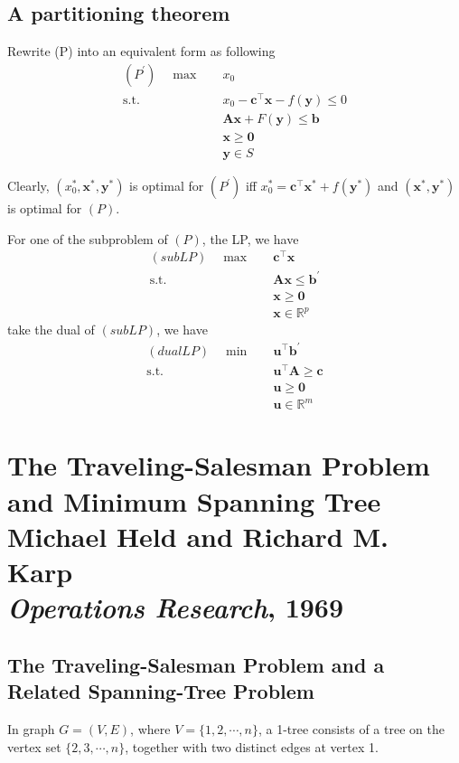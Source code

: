 		\section{A partitioning theorem}
			Rewrite (P) into an equivalent form as following
			\begin{align*}
				(P^\prime) \quad \max \quad & x_0\\
				\text{s.t.} \quad & x_0 - \mathbf{c}^\top \mathbf{x} - f(\mathbf{y}) \le 0\\
				& \mathbf{Ax} + F(\mathbf{y}) \le \mathbf{b}\\
				& \mathbf{x} \ge \mathbf{0} \\
				& \mathbf{y} \in S
			\end{align*}

			Clearly, $(x_0^*, \mathbf{x}^*, \mathbf{y}^*)$ is optimal for $(P^\prime)$ iff $x_0^* = \mathbf{c}^\top \mathbf{x}^* + f(\mathbf{y}^*)$ and $(\mathbf{x}^*, \mathbf{y}^*)$ is optimal for $(P)$.

			For one of the subproblem of $(P)$, the LP, we have
			\begin{align*}
				(subLP) \quad \max \quad & \mathbf{c}^\top \mathbf{x}\\
				\text{s.t.} \quad & \mathbf{Ax} \le \mathbf{b^\prime}\\
								  & \mathbf{x} \ge \mathbf{0} \\
								  & \mathbf{x} \in \mathbb{R}^p
			\end{align*}
			take the dual of $(subLP)$, we have
			\begin{align*}
				(dualLP) \quad \min \quad & \mathbf{u^\top b^\prime}\\
				\text{s.t.} \quad & \mathbf{u}^\top \mathbf{A} \ge \mathbf{c}\\
								  & \mathbf{u} \ge \mathbf{0}\\
								  & \mathbf{u} \in \mathbb{R}^m
			\end{align*}

	\chapter[The Traveling-Salesman Problem and Minimum Spanning Tree]
		{The Traveling-Salesman Problem and Minimum Spanning Tree \\[\bigskipamount]
		\Large Michael Held and Richard M. Karp \\[\bigskipamount]
		\large \textit{Operations Research}, 1969}\label{chp:TSP-LR}

		\section{The Traveling-Salesman Problem and a Related Spanning-Tree Problem}
			\begin{definition}[1-tree]
				In graph $G = (V, E)$, where $V = \{1, 2, \cdots, n\}$, a 1-tree consists of a tree on the vertex set $\{2, 3, \cdots, n\}$, together with two distinct edges at vertex 1.
			\end{definition}

